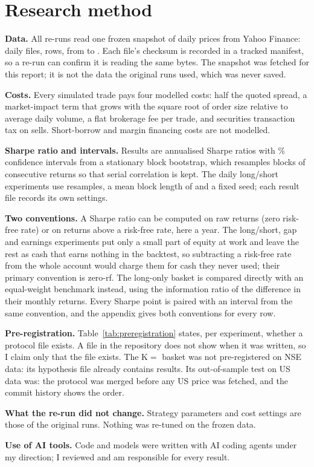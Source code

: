 \section{Research method}\label{sec:method}

\textbf{Data.} All re-runs read one frozen snapshot of daily prices from Yahoo Finance: \SnapshotDailyFiles{} daily files, \SnapshotDailyRows{} rows, from \SnapshotFirstDate{} to \SnapshotLastDate{}. Each file's checksum is recorded in a tracked manifest, so a re-run can confirm it is reading the same bytes. The snapshot was fetched for this report; it is not the data the original runs used, which was never saved.

\textbf{Costs.} Every simulated trade pays four modelled costs: half the quoted spread, a market-impact term that grows with the square root of order size relative to average daily volume, a flat brokerage fee per trade, and securities transaction tax on sells. Short-borrow and margin financing costs are not modelled.

\textbf{Sharpe ratio and intervals.} Results are annualised Sharpe ratios with \CILevel\% confidence intervals from a stationary block bootstrap, which resamples blocks of consecutive returns so that serial correlation is kept. The daily long/short experiments use \NBootstrap{} resamples, a mean block length of \MeanBlockLength{} and a fixed seed; each result file records its own settings.

\textbf{Two conventions.} A Sharpe ratio can be computed on raw returns (zero risk-free rate) or on returns above a risk-free rate, here \RiskFreeAnnual{} a year. The long/short, gap and earnings experiments put only a small part of equity at work and leave the rest as cash that earns nothing in the backtest, so subtracting a risk-free rate from the whole account would charge them for cash they never used; their primary convention is zero-rf. The long-only basket is compared directly with an equal-weight benchmark instead, using the information ratio of the difference in their monthly returns. Every Sharpe point is paired with an interval from the same convention, and the appendix gives both conventions for every row.

\textbf{Pre-registration.} Table~\ref{tab:preregistration} states, per experiment, whether a protocol file exists. A file in the repository does not show when it was written, so I claim only that the file exists. The K$=$\BasketK{} basket was not pre-registered on NSE data: its hypothesis file already contains results. Its out-of-sample test on US data was: the protocol was merged before any US price was fetched, and the commit history shows the order.



\textbf{What the re-run did not change.} Strategy parameters and cost settings are those of the original runs. Nothing was re-tuned on the frozen data.

\textbf{Use of AI tools.} Code and models were written with AI coding agents under my direction; I reviewed and am responsible for every result.
